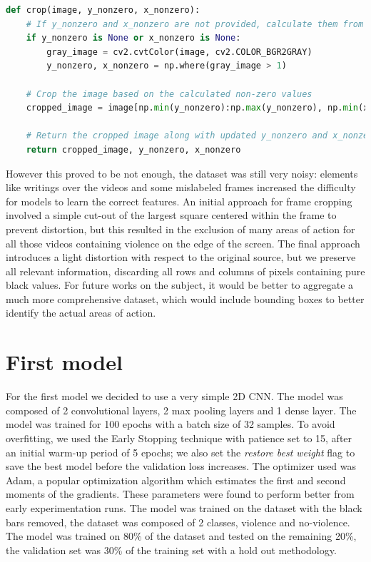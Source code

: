 \begin{lstlisting}[language=Python, caption={Image Cropper}, label={lst:ImageCropper}]
def crop(image, y_nonzero, x_nonzero):
    # If y_nonzero and x_nonzero are not provided, calculate them from the grayscale version of the image
    if y_nonzero is None or x_nonzero is None:
        gray_image = cv2.cvtColor(image, cv2.COLOR_BGR2GRAY)
        y_nonzero, x_nonzero = np.where(gray_image > 1)

    # Crop the image based on the calculated non-zero values
    cropped_image = image[np.min(y_nonzero):np.max(y_nonzero), np.min(x_nonzero):np.max(x_nonzero)]

    # Return the cropped image along with updated y_nonzero and x_nonzero values
    return cropped_image, y_nonzero, x_nonzero
\end{lstlisting}

However this proved to be not enough, the dataset was still very noisy: elements like writings over the videos and some mislabeled frames increased the difficulty for models to learn the correct features. An initial approach for frame cropping involved a simple cut-out of the largest square centered within the frame to prevent distortion, but this resulted in the exclusion of many areas of action for all those videos containing violence on the edge of the screen. The final approach introduces a light distortion with respect to the original source, but we preserve all relevant information, discarding all rows and columns of pixels containing pure black values. For future works on the subject, it would be better to aggregate a much more comprehensive dataset, which would include bounding boxes to better identify the actual areas of action.

\section{First model}
For the first model we decided to use a very simple 2D CNN. The model was composed of 2 convolutional layers, 2 max pooling layers and 1 dense layer. The model was trained for 100 epochs with a batch size of 32 samples. To avoid overfitting, we used the Early Stopping technique with patience set to 15, after an initial warm-up period of 5 epochs; we also set the \textit{restore best weight} flag to save the best model before the validation loss increases. The optimizer used was Adam, a popular optimization algorithm which estimates the first and second moments of the gradients. These parameters were found to perform better from early experimentation runs. The model was trained on the dataset with the black bars removed, the dataset was composed of 2 classes, violence and no-violence. The model was trained on 80\% of the dataset and tested on the remaining 20\%, the validation set was 30\% of the training set with a hold out methodology.  


